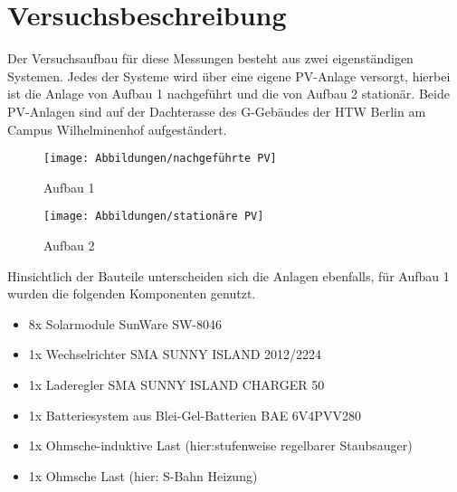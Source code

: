 \section{Versuchsbeschreibung}
\label{section:Versuchsbeschreibung}
Der Versuchsaufbau für diese Messungen besteht aus zwei eigenständigen Systemen.
Jedes der Systeme wird über eine eigene PV-Anlage versorgt, hierbei ist die Anlage
von Aufbau 1 nachgeführt und die von Aufbau 2 stationär. Beide PV-Anlagen sind auf
der Dachterasse des G-Gebäudes der HTW Berlin am Campus Wilhelminenhof aufgeständert.\\

\begin{figure}[!h]
	\begin{minipage}[c]{0.5\linewidth}
		\centering
		\texttt{[image: Abbildungen/nachgeführte PV]}
		\caption*{Aufbau 1}
	\end{minipage}
	\begin{minipage}[c]{0.5\linewidth}
		\centering
		\texttt{[image: Abbildungen/stationäre PV]}
		\caption*{Aufbau 2}
	\end{minipage}
\end{figure}

Hinsichtlich der Bauteile unterscheiden sich die Anlagen ebenfalls, für Aufbau 1 
wurden die folgenden Komponenten genutzt.\\
\begin{itemize}
	\item 8x Solarmodule SunWare SW-8046 
	\item 1x Wechselrichter SMA SUNNY ISLAND 2012/2224 
	\item 1x Laderegler SMA SUNNY ISLAND CHARGER 50 
	\item 1x Batteriesystem aus Blei-Gel-Batterien BAE 6V4PVV280
	\item 1x Ohmsche-induktive Last (hier:stufenweise regelbarer Staubsauger)
	\item 1x Ohmsche Last (hier: S-Bahn Heizung)
\end{itemize}
%

